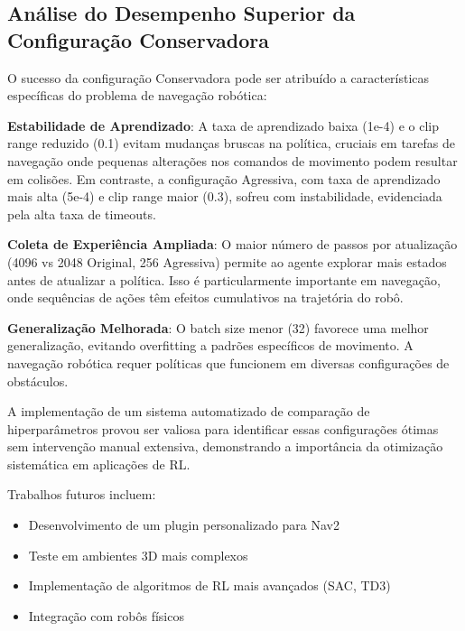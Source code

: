 \documentclass[9pt,a4paper,twoside]{tau}
\begin{document}
\subsection{Análise do Desempenho Superior da Configuração Conservadora}

O sucesso da configuração Conservadora pode ser atribuído a características específicas do problema de navegação robótica:

\textbf{Estabilidade de Aprendizado}: A taxa de aprendizado baixa (1e-4) e o clip range reduzido (0.1) evitam mudanças bruscas na política, cruciais em tarefas de navegação onde pequenas alterações nos comandos de movimento podem resultar em colisões. Em contraste, a configuração Agressiva, com taxa de aprendizado mais alta (5e-4) e clip range maior (0.3), sofreu com instabilidade, evidenciada pela alta taxa de timeouts.

\textbf{Coleta de Experiência Ampliada}: O maior número de passos por atualização (4096 vs 2048 Original, 256 Agressiva) permite ao agente explorar mais estados antes de atualizar a política. Isso é particularmente importante em navegação, onde sequências de ações têm efeitos cumulativos na trajetória do robô.

\textbf{Generalização Melhorada}: O batch size menor (32) favorece uma melhor generalização, evitando overfitting a padrões específicos de movimento. A navegação robótica requer políticas que funcionem em diversas configurações de obstáculos.

A implementação de um sistema automatizado de comparação de hiperparâmetros provou ser valiosa para identificar essas configurações ótimas sem intervenção manual extensiva, demonstrando a importância da otimização sistemática em aplicações de RL.

Trabalhos futuros incluem:
\begin{itemize}
    \item Desenvolvimento de um plugin personalizado para Nav2
    \item Teste em ambientes 3D mais complexos
    \item Implementação de algoritmos de RL mais avançados (SAC, TD3)
    \item Integração com robôs físicos
\end{itemize}

\printbibliography
\end{document}
